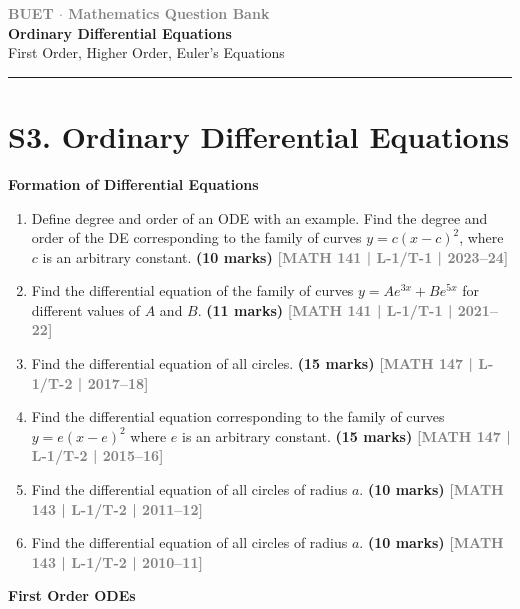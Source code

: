 \documentclass[12pt,a4paper]{article}
\newcommand{\yr}[1]{\hfill\textcolor{gray}{\small\textbf{[#1]}}}
\newcommand{\mk}[1]{\textcolor{orange!70!black}{\small\textbf{(#1 marks)}}}
\newcommand{\subtopic}[2]{%
  \vspace{10pt}
  \noindent\begin{tcolorbox}[colback=#1!8,colframe=#1,boxrule=0.6pt,arc=4pt,
    left=6pt,right=6pt,top=4pt,bottom=4pt]
    \small\bfseries\textcolor{#1}{#2}
  \end{tcolorbox}
  \vspace{2pt}
}
\newcommand{\secdivider}[3]{%
  \newpage\thispagestyle{empty}%
  \vspace*{\fill}%
  \begin{tcolorbox}[enhanced,colback=#3!6,colframe=#3,boxrule=1.5pt,arc=8pt,
    left=20pt,right=20pt,top=22pt,bottom=22pt,
    shadow={3pt}{-3pt}{0pt}{black!15}]
    \centering
    {\large\textcolor{gray}{\textbf{BUET $\cdot$ Mathematics Question Bank}}}\\[8pt]
    {\fontsize{26}{32}\selectfont\bfseries\textcolor{#3}{#1}}\\[6pt]
    {\fontsize{15}{19}\selectfont\textcolor{dgray}{#2}}\\[12pt]
    \textcolor{#3!60}{\rule{0.5\textwidth}{0.5pt}}
  \end{tcolorbox}%
  \vspace*{\fill}\newpage%
}
\begin{document}
\secdivider{Ordinary Differential Equations}{First Order, Higher Order, Euler's Equations}{cC}

\section{S3. Ordinary Differential Equations}
\label{sec:S3}

\subtopic{cC}{Formation of Differential Equations}
\label{sub:s3-formation}

\begin{enumerate}\item Define degree and order of an ODE with an example. Find the degree and order of the DE corresponding to the family of curves $y=c(x-c)^{2}$, where $c$ is an arbitrary constant.
\mk{10} \yr{MATH 141 | L-1/T-1 | 2023--24}

\item Find the differential equation of the family of curves $y=Ae^{3x}+Be^{5x}$ for different values of $A$ and $B$.
\mk{11} \yr{MATH 141 | L-1/T-1 | 2021--22}

\item Find the differential equation of all circles.
\mk{15} \yr{MATH 147 | L-1/T-2 | 2017--18}

\item Find the differential equation corresponding to the family of curves $y=e(x-e)^{2}$ where $e$ is an arbitrary constant.
\mk{15} \yr{MATH 147 | L-1/T-2 | 2015--16}

\item Find the differential equation of all circles of radius $a$.
\mk{10\textonehalf} \yr{MATH 143 | L-1/T-2 | 2011--12}

\item Find the differential equation of all circles of radius $a$.
\mk{10} \yr{MATH 143 | L-1/T-2 | 2010--11}

\end{enumerate}

\subtopic{cC}{First Order ODEs}
\label{sub:s3-first}
\end{document}
